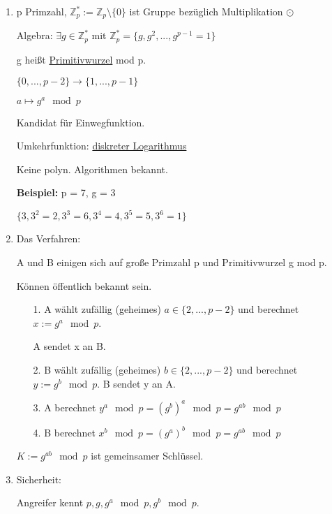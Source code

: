   \begin{enumerate}[label=(\alph*)]
    \item p Primzahl, $\mathbb{Z}_p^* := \mathbb{Z}_p \setminus \{0\}$ ist Gruppe bezüglich Multiplikation $\odot$

    Algebra: $\exists g \in \mathbb{Z}_p^*$ mit $\mathbb{Z}_p^* = \{g, g^2, ..., g^{p-1} = 1\}$

    g heißt \underline{Primitivwurzel} mod p.

    $\{0, ..., p-2\} \rightarrow \{1,...,p-1\}$

    $a \mapsto g^a \mod p $

    Kandidat für Einwegfunktion.

    \par \medskip

    Umkehrfunktion: \underline{diskreter Logarithmus}

    Keine polyn. Algorithmen bekannt.

    \textbf{Beispiel:} p = 7, g = 3

    $\{3, 3^2 = 2, 3^3 = 6, 3^4 = 4, 3^5 = 5, 3^6 = 1\}$

    \item Das Verfahren:

    A und B einigen sich auf große Primzahl p und Primitivwurzel g mod p.

    Können öffentlich bekannt sein.

    \begin{enumerate}
      \item[1.] A wählt zufällig (geheimes) $a \in \{2,...,p-2\}$ und berechnet $x := g^a \mod p$.

      A sendet x an B.

      \item[2.] B wählt zufällig (geheimes) $b \in \{2,...,p-2\}$ und berechnet $y := g^b \mod p$. B sendet y an A.

      \item[3.] A berechnet $y^a \mod p =(g^b)^a \mod p = g^{ab} \mod p$

      \item[4.] B berechnet $x^b \mod p = (g^a)^b \mod p = g^{ab} \mod p$
    \end{enumerate}

    $K := g^{ab} \mod p$ ist gemeinsamer Schlüssel.

    \item Sicherheit:

    Angreifer kennt $p,g, g^a \mod p, g^b \mod p$.


\end{enumerate}
